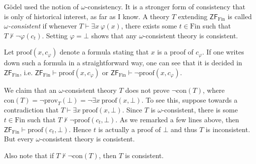 \documentclass[a4paper, 11pt]{amsart}
\theoremstyle{remark}
\newcommand{\axiomft}[1]{\mathsf{#1}}
\newcommand{\ZF}{\axiomft{ZF}}
\newcommand{\Fin}{\mathrm{Fin}}
\newcommand{\prov}{\mathrm{prov}}
\begin{document}
G\"odel used the notion of $\omega$-consistency. 
It is a stronger form of consistency that is only of historical interest, as far as I know. 
A theory $T$ extending $\ZF_\Fin$ is called \emph{$\omega$-consistent} if whenever $T\vdash \exists x\ \varphi(x)$, there exists some $t\in \Fin$ such that $T\not\vdash \neg \varphi(c_t)$. 
Setting $\varphi=\bot$ shows that any $\omega$-consistent theory is consistent. 

Let $\mathrm{proof}(x,c_\varphi)$ denote a formula stating that $x$ is a proof of $c_\varphi$. 
If one writes down such a formula in a straightforward way, one can see that it is decided in $\ZF_\Fin$, i.e. $\ZF_\Fin \vdash \mathrm{proof}(x,c_\varphi)$ or $\ZF_\Fin \vdash \neg\mathrm{proof}(x,c_\varphi)$. 

We claim that an $\omega$-consistent theory $T$ does not prove $\neg\mathrm{con}(T)$, where $\mathrm{con}(T)=\neg \prov_T(\bot)= \neg\exists x\ \mathrm{proof}(x,\bot)$. 
To see this, suppose towards a contradiction that $T\vdash \exists x\ \mathrm{proof}(x,\bot)$. 
Since $T$ is $\omega$-consistent, there is some $t\in \Fin$ such that $T\not\vdash \neg\mathrm{proof}(c_t,\bot)$. 
As we remarked a few lines above, then $\ZF_\Fin\vdash\mathrm{proof}(c_t,\bot)$. 
Hence $t$ is actually a proof of $\bot$ and thus $T$ is inconsistent. 
But every $\omega$-consistent theory is consistent. 

Also note that if $T\not\vdash \neg\mathrm{con}(T)$, then $T$ is consistent. 
\end{document}
